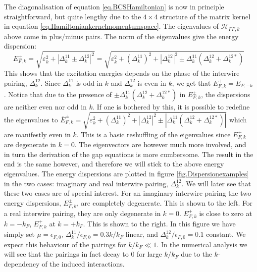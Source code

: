 The diagonalisation of equation \eqref{eq.BCSHamiltonian} is now in principle straightforward, but quite lengthy due to the $4\times 4$ structure of the matrix kernel in equation \eqref{eq.Hamiltoniankernelmomentumspace}. The eigenvalues of $\mathcal{H}_{FF,k}$ above come in plus/minus pairs. The norm of the eigenvalues give the energy dispersion: 
\begin{equation}
E^{\pm}_{F,k} = \sqrt{\varepsilon_k^2 + |\Delta^{11}_k \pm \Delta^{12}_k|^2} = \sqrt{\varepsilon^2_k + \left(\Delta^{11}_k\right)^2 + \left|\Delta^{12}_k\right|^2 \pm \Delta^{11}_k(\Delta^{12}_k + \Delta^{12*}_k)}
\end{equation} 
This shows that the excitation energies depends on the phase of the interwire pairing, $\Delta^{12}_k$. Since $\Delta^{11}_k$ is odd in $k$ and $\Delta^{12}_k$ is even in $k$, we get that $E^{+}_{F,k} = E^{-}_{F,-k}$. Notice that due to the presence of $\pm \Delta^{11}_k(\Delta^{12}_k + \Delta^{12*}_k)$ in $E^{\pm}_{F,k}$, the dispersions are neither even nor odd in $k$. If one is bothered by this, it is possible to redefine the eigenvalues to $\bar{E}^{\pm}_{F,k} = \sqrt{\varepsilon^2_k + \left(\Delta^{11}_k\right)^2 + \left|\Delta^{12}_k\right|^2 \pm |\Delta^{11}_k(\Delta^{12}_k + \Delta^{12*}_k)|}$ which are manifestly even in $k$. This is a basic reshuffling of the eigenvalues since $E^{\pm}_{F,k}$ are degenerate in $k = 0$. The eigenvectors are however much more involved, and in turn the derivation of the gap equations is more cumbersome. The result in the end is the same however, and therefore we will stick to the above energy eigenvalues. The energy dispersions are plotted in figure \ref{fig.Dispersionexamples} in the two cases: imaginary and real interwire pairing, $\Delta^{12}_k$. We will later see that these two cases are of special interest. For an imaginary interwire pairing the two energy dispersions, $E^{\pm}_{F,k}$, are completely degenerate. This is shown to the left. For a real interwire pairing, they are only degenerate in $k = 0$. $E^{+}_{F,k}$ is close to zero at $k = -k_F$, $E^{+}_{F,k}$ at $k = +k_F$. This is shown to the right. In this figure we have simply set $\mu = \epsilon_{F,0}$, $\Delta^{11}_k / \epsilon_{F,0} = 0.3 k / k_F$ linear, and $\Delta^{12}_k / \epsilon_{F,0} = 0.1$ constant. We expect this behaviour of the pairings for $k / k_F \ll 1$. In the numerical analysis we will see that the pairings in fact decay to 0 for large $k / k_F$ due to the $k$-dependency of the induced interactions. 

